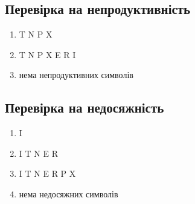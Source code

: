 \newpage
\subsection{Перевірка на непродуктивність}
\begin{enumerate}
    \item  T N P X
    \item  T N P X E R I
    \item  нема непродуктивних символів
\end{enumerate}

\subsection{Перевірка на недосяжність}
\begin{enumerate}
    \item  I
    \item  I T N E R
    \item  I T N E R P X
    \item  нема недосяжних символів
\end{enumerate}
